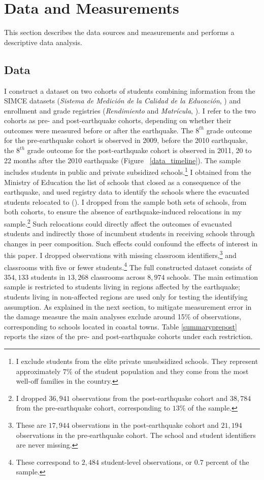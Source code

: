 \section{Data and Measurements}\label{sec:data_and_measurements}
This section describes the data sources and measurements and performs a descriptive data analysis.
\subsection{Data}\label{sec:data}
I construct a dataset on two cohorts of students combining information from the SIMCE datasets  ({\itshape Sistema de Medici\'{o}n de la Calidad de la Educaci\'{o}n}, \cite{agencia_simce_scores}) and enrollment and grade registries ({\itshape Rendimiento} and {\itshape Matr\'{i}cula}, \cite{mineduc_rendimiento_2005_2010,mineduc_matricula_2009}). I refer to the two cohorts as pre- and post-earthquake cohorts, depending on whether their outcomes were measured before or after the earthquake. The $8^{th}$ grade outcome for the pre-earthquake cohort is observed in 2009, before the 2010 earthquake, the $8^{th}$ grade outcome for the post-earthquake cohort is observed in 2011, 20 to 22 months after the 2010 earthquake (Figure ~\ref{data_timeline}). The sample includes students in public and private subsidized schools.\footnote{I exclude students from the elite private unsubsidized schools. They represent approximately $7\%$ of the student population and they come from the most well-off families in the country.} I obtained from the Ministry of Education the list of schools that closed as a consequence of the earthquake, and used registry data to identify the schools where the evacuated students relocated to (\cite{tincani_school_closures}). I dropped from the sample both sets of schools, from both cohorts, to ensure the absence of earthquake-induced relocations in my sample.\footnote{I dropped $36,941$ observations from the post-earthquake cohort and $38,784$ from the pre-earthquake cohort, corresponding to $13\%$ of the sample.} Such relocations could directly affect the outcomes of evacuated students and indirectly those of incumbent students in receiving schools through changes in peer composition. Such effects could confound the effects of interest in this paper. I dropped observations with missing classroom identifiers,\footnote{These are $17,944$ observations in the post-earthquake cohort and $21,194$ observations in the pre-earthquake cohort. The school and student identifiers are never missing.} and classrooms with five or fewer students.\footnote{These correspond to $2,484$ student-level observations, or $0.7$ percent of the sample.} The full constructed dataset consists of $354,133$ students in $13,268$ classrooms across $8,974$ schools. The main estimation sample is restricted to students living in regions affected by the earthquake; students living in non-affected regions are used only for testing the identifying assumption. As explained in the next section, to mitigate measurement error in the damage measure the main analyses exclude around 15\% of observations, corresponding to schools located in coastal towns. Table \ref{summaryprepost} reports the sizes of the pre- and post-earthquake cohorts under each restriction.   \par  

